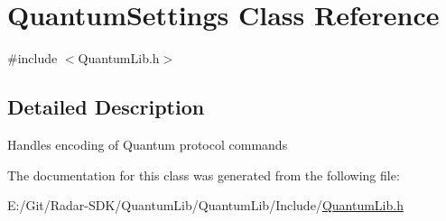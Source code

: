 \hypertarget{class_quantum_settings}{}\section{Quantum\+Settings Class Reference}
\label{class_quantum_settings}


{\ttfamily \#include $<$Quantum\+Lib.\+h$>$}



\subsection{Detailed Description}
Handles encoding of Quantum protocol commands 

The documentation for this class was generated from the following file\+:\begin{DoxyCompactItemize}
\item 
E\+:/\+Git/\+Radar-\/\+S\+D\+K/\+Quantum\+Lib/\+Quantum\+Lib/\+Include/\mbox{\hyperlink{_quantum_lib_8h}{Quantum\+Lib.\+h}}\end{DoxyCompactItemize}
